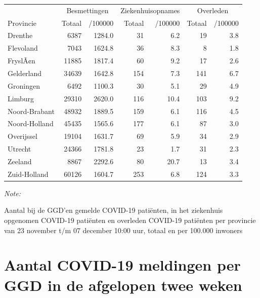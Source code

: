 \documentclass[
  english,
  man,floatsintext]{apa6}
\begin{document}
\begin{table}
\centering
\begin{threeparttable}
\begin{tabular}{lrrrrrr}
\toprule
\multicolumn{1}{c}{ } & \multicolumn{2}{c}{Besmettingen} & \multicolumn{2}{c}{Ziekenhuisopnames} & \multicolumn{2}{c}{Overleden} \\
\cmidrule(l{3pt}r{3pt}){2-3} \cmidrule(l{3pt}r{3pt}){4-5} \cmidrule(l{3pt}r{3pt}){6-7}
Provincie & Totaal & /100000 & Totaal & /100000 & Totaal & /100000\\
\midrule
Drenthe & 6387 & 1284.0 & 31 & 6.2 & 19 & 3.8\\
Flevoland & 7043 & 1624.8 & 36 & 8.3 & 8 & 1.8\\
FryslÃ¢n & 11885 & 1817.4 & 60 & 9.2 & 17 & 2.6\\
Gelderland & 34639 & 1642.8 & 154 & 7.3 & 141 & 6.7\\
Groningen & 6492 & 1100.3 & 30 & 5.1 & 29 & 4.9\\
Limburg & 29310 & 2620.0 & 116 & 10.4 & 103 & 9.2\\
Noord-Brabant & 48932 & 1889.5 & 159 & 6.1 & 116 & 4.5\\
Noord-Holland & 45435 & 1565.6 & 177 & 6.1 & 87 & 3.0\\
Overijssel & 19104 & 1631.7 & 69 & 5.9 & 34 & 2.9\\
Utrecht & 24366 & 1781.8 & 23 & 1.7 & 31 & 2.3\\
Zeeland & 8867 & 2292.6 & 80 & 20.7 & 13 & 3.4\\
Zuid-Holland & 60126 & 1604.7 & 253 & 6.8 & 124 & 3.3\\
\bottomrule
\end{tabular}
\begin{tablenotes}
\item \textit{Note: } 
\item Aantal bij de GGD’en gemelde COVID-19 patiënten, in het ziekenhuis opgenomen COVID-19 patiënten en overleden COVID-19 patiënten per provincie van 23 november t/m 07 december 10:00 uur, totaal en per 100.000 inwoners
\end{tablenotes}
\end{threeparttable}
\end{table}

\newpage

\hypertarget{aantal-covid-19-meldingen-per-ggd-in-de-afgelopen-twee-weken}{%
\section{Aantal COVID-19 meldingen per GGD in de afgelopen twee weken}\label{aantal-covid-19-meldingen-per-ggd-in-de-afgelopen-twee-weken}}
\end{document}
